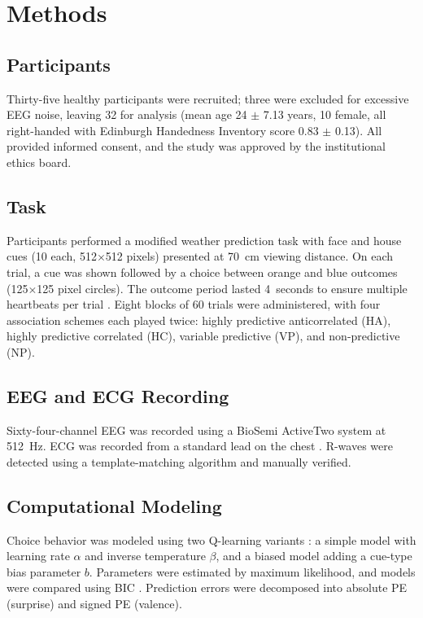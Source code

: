\documentclass[11pt]{article}
\begin{document}
\section{Methods}

\subsection{Participants}

Thirty-five healthy participants were recruited; three were excluded for excessive EEG noise, leaving 32 for analysis (mean age 24 $\pm$ 7.13 years, 10 female, all right-handed with Edinburgh Handedness Inventory score 0.83 $\pm$ 0.13). All provided informed consent, and the study was approved by the institutional ethics board.

\subsection{Task}

Participants performed a modified weather prediction task with face and house cues (10 each, 512$\times$512 pixels) presented at 70~cm viewing distance. On each trial, a cue was shown followed by a choice between orange and blue outcomes (125$\times$125 pixel circles). The outcome period lasted 4~seconds to ensure multiple heartbeats per trial \citep{eeg_64channel2003}. Eight blocks of 60 trials were administered, with four association schemes each played twice: highly predictive anticorrelated (HA), highly predictive correlated (HC), variable predictive (VP), and non-predictive (NP).

\subsection{EEG and ECG Recording}

Sixty-four-channel EEG was recorded using a BioSemi ActiveTwo system at 512~Hz. ECG was recorded from a standard lead on the chest \citep{ecg_rwave2015}. R-waves were detected using a template-matching algorithm and manually verified.

\subsection{Computational Modeling}

Choice behavior was modeled using two Q-learning variants \citep{sutton1998reinforcement}: a simple model with learning rate $\alpha$ and inverse temperature $\beta$, and a biased model adding a cue-type bias parameter $b$. Parameters were estimated by maximum likelihood, and models were compared using BIC \citep{bic_schwarz1978}. Prediction errors were decomposed into absolute PE (surprise) and signed PE (valence).
\end{document}
